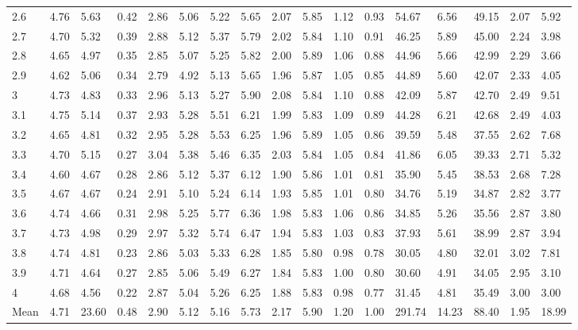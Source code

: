 \begin{adjustbox}{angle=90}
\begin{center}
\begin{tabular}{|l|llllllllllllllll|}
2.6&4.76&5.63&0.42&2.86&5.06&5.22&5.65&2.07&5.85&1.12&0.93&54.67&6.56&49.15&2.07&5.92  \\ 
2.7&4.70&5.32&0.39&2.88&5.12&5.37&5.79&2.02&5.84&1.10&0.91&46.25&5.89&45.00&2.24&3.98  \\ 
2.8&4.65&4.97&0.35&2.85&5.07&5.25&5.82&2.00&5.89&1.06&0.88&44.96&5.66&42.99&2.29&3.66  \\ 
2.9&4.62&5.06&0.34&2.79&4.92&5.13&5.65&1.96&5.87&1.05&0.85&44.89&5.60&42.07&2.33&4.05  \\ 
3&4.73&4.83&0.33&2.96&5.13&5.27&5.90&2.08&5.84&1.10&0.88&42.09&5.87&42.70&2.49&9.51  \\ 
3.1&4.75&5.14&0.37&2.93&5.28&5.51&6.21&1.99&5.83&1.09&0.89&44.28&6.21&42.68&2.49&4.03  \\ 
3.2&4.65&4.81&0.32&2.95&5.28&5.53&6.25&1.96&5.89&1.05&0.86&39.59&5.48&37.55&2.62&7.68  \\ 
3.3&4.70&5.15&0.27&3.04&5.38&5.46&6.35&2.03&5.84&1.05&0.84&41.86&6.05&39.33&2.71&5.32  \\ 
3.4&4.60&4.67&0.28&2.86&5.12&5.37&6.12&1.90&5.86&1.01&0.81&35.90&5.45&38.53&2.68&7.28  \\ 
3.5&4.67&4.67&0.24&2.91&5.10&5.24&6.14&1.93&5.85&1.01&0.80&34.76&5.19&34.87&2.82&3.77  \\ 
3.6&4.74&4.66&0.31&2.98&5.25&5.77&6.36&1.98&5.83&1.06&0.86&34.85&5.26&35.56&2.87&3.80  \\ 
3.7&4.73&4.98&0.29&2.97&5.32&5.74&6.47&1.94&5.83&1.03&0.83&37.93&5.61&38.99&2.87&3.94  \\ 
3.8&4.74&4.81&0.23&2.86&5.03&5.33&6.28&1.85&5.80&0.98&0.78&30.05&4.80&32.01&3.02&7.81  \\ 
3.9&4.71&4.64&0.27&2.85&5.06&5.49&6.27&1.84&5.83&1.00&0.80&30.60&4.91&34.05&2.95&3.10  \\ 
4&4.68&4.56&0.22&2.87&5.04&5.26&6.25&1.88&5.83&0.98&0.77&31.45&4.81&35.49&3.00&3.00  \\ \hline \hline
Mean&4.71&23.60&0.48&2.90&5.12&5.16&5.73&2.17&5.90&1.20&1.00&291.74&14.23&88.40&1.95&18.99  \\ \hline
\end{tabular}
\end{center}
\end{adjustbox}






